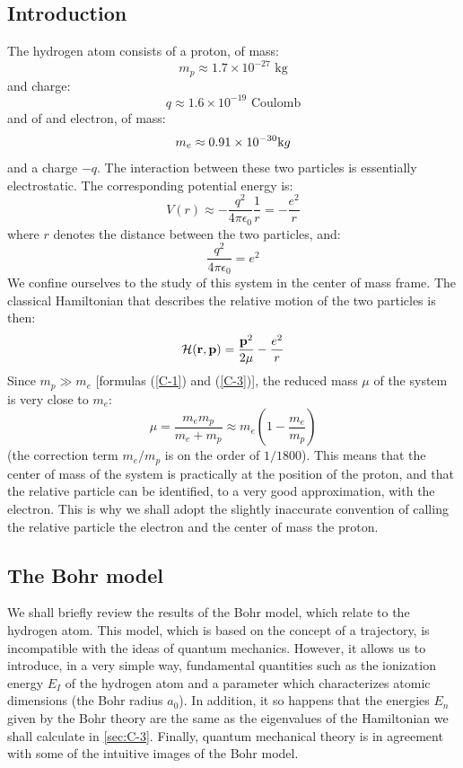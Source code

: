 \subsection{Introduction}
The hydrogen atom consists of a proton, of mass:
\begin{equation}\label{C-1}
	m_p\approx 1.7\times 10^{-27} \mbox{ kg}
\end{equation}
and charge:
\begin{equation}\label{C-2}
	q\approx 1.6\times 10^{-19} \mbox{ Coulomb}
\end{equation}
and of and electron, of mass:
\begin{equation}\label{C-3}
	m_e\approx 0.91\times 10^{-30}\mbox kg
\end{equation}
and a charge $-q$. The interaction between these two particles is essentially electrostatic. The corresponding potential energy is:
\begin{equation}\label{C-4}
	V(r)\approx -\frac{q^2}{4\pi\epsilon_0}\frac{1}{r}=-\frac{e^2}{r}
\end{equation}
where $r$ denotes the distance between the two particles, and:
\begin{equation}\label{C-5}
	\frac{q^2}{4\pi\epsilon_0}=e^2
\end{equation}
We confine ourselves to the study of this system in the center of mass frame. The classical Hamiltonian that describes the relative motion of the two particles is then:
\begin{equation}\label{C-6}
	\mathcal{H}(\vb{r},\vb{p})=\frac{\vb{p}^2}{2\mu}-\frac{e^2}{r}
\end{equation}
Since $m_p \gg m_e$ [formulas (\ref{C-1}) and (\ref{C-3})], the reduced mass $\mu$ of the system is very close to $m_e$:
\begin{equation}\label{C-7}
	\mu=\frac{m_em_p}{m_e+m_p}\approx m_e\left(1-\frac{m_e}{m_p}\right)
\end{equation}
(the correction term $m_e/m_p$ is on the order of $1/1800$).  This means that the center of mass of the system is practically at the position of the proton, and that the relative particle can be identified, to a very good approximation, with the electron. This is why we shall adopt the slightly inaccurate convention of calling the relative particle the electron and the center of mass the proton.

\subsection{The Bohr model}
We shall briefly review the results of the Bohr model, which relate to the hydrogen atom. This model, which is based on the concept of a trajectory, is incompatible with the ideas of quantum mechanics. However, it allows us to introduce, in a very simple way, fundamental quantities such as the ionization energy $E_I$ of the hydrogen atom and a parameter which characterizes atomic dimensions (the Bohr radius $a_0$). In addition, it so happens that the energies $E_n$ given by the Bohr theory are the same as the eigenvalues of the Hamiltonian we shall calculate in \ref{sec:C-3}. Finally, quantum mechanical theory is in agreement with some of the intuitive images of the Bohr model.

